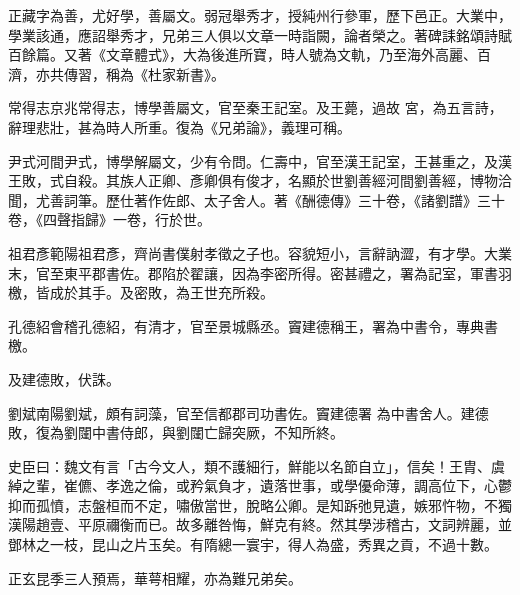 \begin{pinyinscope}
 正藏字為善，尤好學，善屬文。弱冠舉秀才，授純州行參軍，歷下邑正。大業中，學業該通，應詔舉秀才，兄弟三人俱以文章一時詣闕，論者榮之。著碑誄銘頌詩賦百餘篇。又著《文章體式》，大為後進所寶，時人號為文軌，乃至海外高麗、百濟，亦共傳習，稱為《杜家新書》。



 常得志京兆常得志，博學善屬文，官至秦王記室。及王薨，過故
 宮，為五言詩，辭理悲壯，甚為時人所重。復為《兄弟論》，義理可稱。



 尹式河間尹式，博學解屬文，少有令問。仁壽中，官至漢王記室，王甚重之，及漢王敗，式自殺。其族人正卿、彥卿俱有俊才，名顯於世劉善經河間劉善經，博物洽聞，尤善詞筆。歷仕著作佐郎、太子舍人。著《酬德傳》三十卷，《諸劉譜》三十卷，《四聲指歸》一卷，行於世。



 祖君彥範陽祖君彥，齊尚書僕射孝徵之子也。容貌短小，言辭訥澀，有才學。大業末，官至東平郡書佐。郡陷於翟讓，因為李密所得。密甚禮之，署為記室，軍書羽檄，皆成於其手。及密敗，為王世充所殺。



 孔德紹會稽孔德紹，有清才，官至景城縣丞。竇建德稱王，署為中書令，專典書檄。



 及建德敗，伏誅。



 劉斌南陽劉斌，頗有詞藻，官至信都郡司功書佐。竇建德署
 為中書舍人。建德敗，復為劉闥中書侍郎，與劉闥亡歸突厥，不知所終。



 史臣曰：魏文有言「古今文人，類不護細行，鮮能以名節自立」，信矣！王胄、虞綽之輩，崔儦、孝逸之倫，或矜氣負才，遺落世事，或學優命薄，調高位下，心鬱抑而孤憤，志盤桓而不定，嘯傲當世，脫略公卿。是知跅弛見遺，嫉邪忤物，不獨漢陽趙壹、平原禰衡而已。故多離咎悔，鮮克有終。然其學涉稽古，文詞辨麗，並鄧林之一枝，昆山之片玉矣。有隋總一寰宇，得人為盛，秀異之貢，不過十數。



 正玄昆季三人預焉，華萼相耀，亦為難兄弟矣。



\end{pinyinscope}